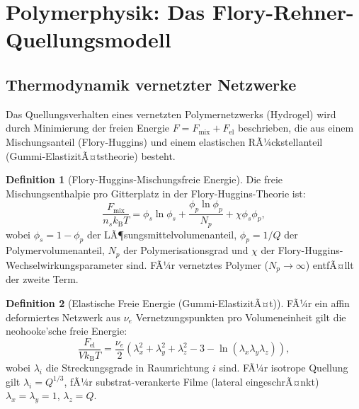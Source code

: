 ﻿\documentclass[a4paper,12pt]{article}
\theoremstyle{definition}
\newtheorem{definition}{Definition}[section]
\begin{document}
	\section{Polymerphysik: Das Flory-Rehner-Quellungsmodell}
	\label{sec:polymer}
	
	\subsection{Thermodynamik vernetzter Netzwerke}
	
	Das Quellungsverhalten eines vernetzten Polymernetzwerks (Hydrogel) wird durch
	Minimierung der freien Energie $F = F_\mathrm{mix} + F_\mathrm{el}$
	beschrieben, die aus einem Mischungsanteil (Flory-Huggins) und einem elastischen
	RÃ¼ckstellanteil (Gummi-ElastizitÃ¤tstheorie) besteht.
	
	\begin{definition}[Flory-Huggins-Mischungsfreie Energie]
		\label{def:flory-huggins}
		Die freie Mischungsenthalpie pro Gitterplatz in der Flory-Huggins-Theorie ist:
		\begin{equation}
			\frac{F_\mathrm{mix}}{n_s k_\mathrm{B}T} = \phi_s \ln\phi_s + \frac{\phi_p \ln\phi_p}{N_p}
			+ \chi \phi_s \phi_p,
			\label{eq:flory-huggins}
		\end{equation}
		wobei $\phi_s = 1 - \phi_p$ der LÃ¶sungsmittelvolumenanteil, $\phi_p = 1/Q$
		der Polymervolumenanteil, $N_p$ der Polymerisationsgrad und $\chi$ der
		Flory-Huggins-Wechselwirkungsparameter sind.
		FÃ¼r vernetztes Polymer ($N_p \to \infty$) entfÃ¤llt der zweite Term.
	\end{definition}
	
	\begin{definition}[Elastische Freie Energie (Gummi-ElastizitÃ¤t)]
		\label{def:elastizitaet}
		FÃ¼r ein affin deformiertes Netzwerk aus $\nu_e$ Vernetzungspunkten
		pro Volumeneinheit gilt die neohooke'sche freie Energie:
		\begin{equation}
			\frac{F_\mathrm{el}}{Vk_\mathrm{B}T} = \frac{\nu_e}{2}\left(
			\lambda_x^2 + \lambda_y^2 + \lambda_z^2 - 3 - \ln(\lambda_x\lambda_y\lambda_z)
			\right),
			\label{eq:elastizitaet}
		\end{equation}
		wobei $\lambda_i$ die Streckungsgrade in Raumrichtung $i$ sind.
		FÃ¼r isotrope Quellung gilt $\lambda_i = Q^{1/3}$, fÃ¼r substrat-verankerte
		Filme (lateral eingeschrÃ¤nkt) $\lambda_x = \lambda_y = 1$, $\lambda_z = Q$.
	\end{definition}
	
\end{document}
